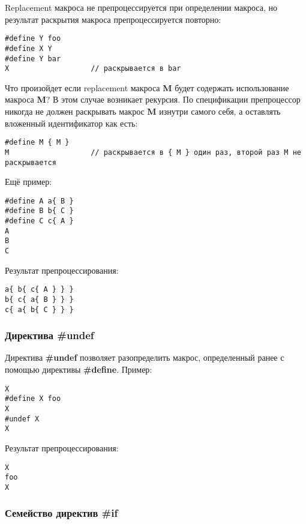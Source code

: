 Replacement макроса не препроцессируется при определении макроса, но результат раскрытия макроса препроцессируется повторно:
\begin{verbatim}
#define Y foo
#define X Y
#define Y bar
X                   // раскрывается в bar
\end{verbatim}

Что произойдет если replacement макроса {\bf M} будет содержать использование макроса {\bf M}? В этом случае возникает рекурсия. По спецификации препроцессор никогда не должен раскрывать макрос {\bf M} изнутри самого себя, а оставлять вложенный идентификатор как есть:

\begin{verbatim}
#define M { M }
M                   // раскрывается в { M } один раз, второй раз M не раскрывается
\end{verbatim}

Ещё пример:
\begin{verbatim}
#define A a{ B }
#define B b{ C }
#define C c{ A }
A
B
C
\end{verbatim}
Результат препроцессирования:
\begin{verbatim}
a{ b{ c{ A } } }
b{ c{ a{ B } } }
c{ a{ b{ C } } }
\end{verbatim}

\subsubsection{Директива \#undef}

Директива {\bf \#undef} позволяет разопределить макрос, определенный ранее с помощью директивы {\bf \#define}. Пример:
\begin{verbatim}
X
#define X foo
X
#undef X
X
\end{verbatim}
Результат препроцессирования:
\begin{verbatim}
X
foo
X
\end{verbatim}

\subsubsection{Семейство директив \#if}

